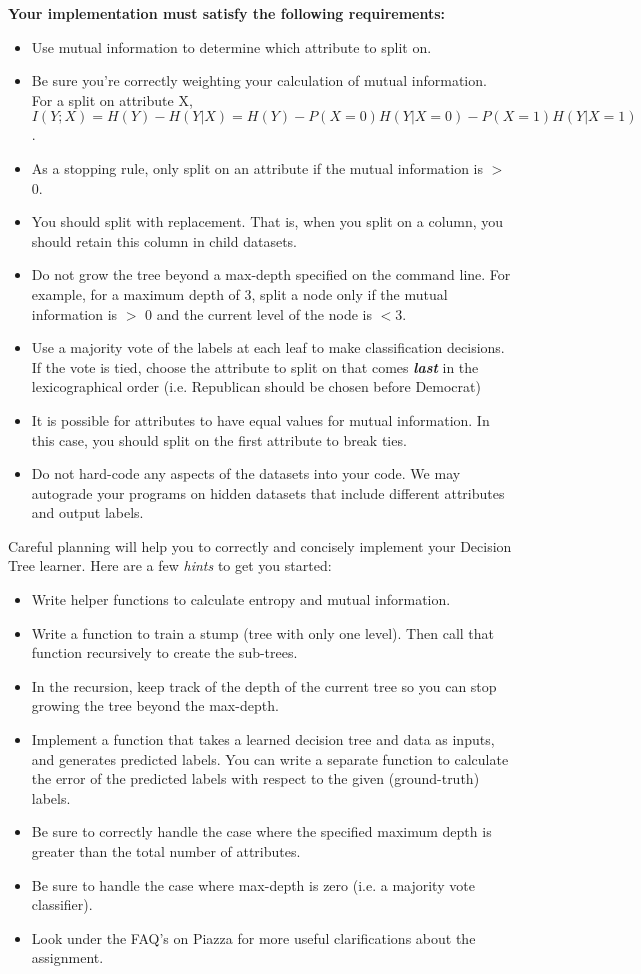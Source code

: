 \documentclass[11pt,addpoints,answers]{exam}
\begin{document}
\textbf{Your implementation must satisfy the following requirements:}
\begin{itemize}
\item Use mutual information to determine which attribute to split on.
\item Be sure you’re correctly weighting your calculation of mutual information. For a split on attribute X, $I(Y;X) = H(Y)-H(Y|X) = H(Y) - P(X=0)H(Y|X = 0) - P(X = 1)H(Y|X = 1)$.
\item As a stopping rule, only split on an attribute if the mutual information is $>$ 0. 
\item You should split with replacement. That is, when you split on a column, you should retain this column in child datasets. 
\item Do not grow the tree beyond a max-depth specified on the command line. For example, for a maximum depth of 3, split a node only if the mutual information is $>$ 0 and the current level of the node is $< 3$.
\item Use a majority vote of the labels at each leaf to make classification decisions. If the vote is tied, choose the attribute to split on that comes \textbf{\textit{last}} in the lexicographical order (i.e. Republican should be chosen before Democrat)
\item It is possible for attributes to have equal values for mutual information. In this case, you should split on the first attribute to break ties.
\item Do not hard-code any aspects of the datasets into your code. We may autograde your programs on hidden datasets that include different attributes and output labels.
\end{itemize}

Careful planning will help you to correctly and concisely implement your Decision Tree learner. Here are a few \emph{hints} to get you started:
\begin{itemize}
    \item Write helper functions to calculate entropy and mutual information.
    \item Write a function to train a stump (tree with only one level). Then call that function recursively to create the sub-trees.
    \item In the recursion, keep track of the depth of the current tree so you can stop growing the tree beyond the max-depth.
    \item Implement a function that takes a learned decision tree and data as inputs, and generates predicted labels. You can write a separate function to calculate the error of the predicted labels with respect to the given (ground-truth) labels.
    \item Be sure to correctly handle the case where the specified maximum depth is greater than the total number of attributes.
    \item Be sure to handle the case where max-depth is zero (i.e. a majority vote classifier). 
    \item Look under the FAQ's on Piazza for more useful clarifications about the assignment.
\end{itemize}
\end{document}
